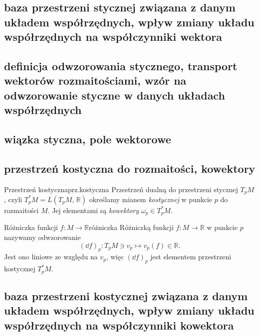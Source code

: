 \documentclass{article}
\newcommand\R{\mathbb{R}}
\begin{document}
\subsection{baza przestrzeni stycznej związana z danym układem współrzędnych, wpływ zmiany układu współrzędnych na współczynniki wektora}

\subsection{definicja odwzorowania stycznego, transport wektorów rozmaitościami, wzór na odwzorowanie styczne w danych układach współrzędnych}  \label{sec:pchnięcie}

\subsection{wiązka styczna, pole wektorowe}










\subsection{przestrzeń kostyczna do rozmaitości, kowektory}

\begin{dfn}{Przestrzeń kostyczna}{prz.kostyczna}
  Przestrzeń dualną do przestrzeni stycznej $T_pM$, czyli $T_p^*M=L(T_pM,\,\mathbb{R})$ określamy mianem \textit{kostycznej} w punkcie $p$ do rozmaitości $M$. Jej elementami są \textit{kowektory} $\omega_p\in T_p^*M$.
\end{dfn}

\begin{dfn}{Różniczka funkcji $f:M\to\R$}{różniczka}
  Różniczką funkcji $f:M\to\mathbb{R}$ w punkcie $p$ nazywamy odwzorowanie
  \[ (\dd{f})_p: T_pM\ni v_p\mapsto v_p(f)\in\mathbb{R}. \]
  Jest ono liniowe ze względu na $v_p$, więc $(\dd{f})_p$ jest elementem przestrzeni kostycznej $T_p^*M$.
\end{dfn}

  










\subsection{baza przestrzeni kostycznej związana z danym układem współrzędnych, wpływ zmiany układu współrzędnych na współczynniki kowektora}
\end{document}
